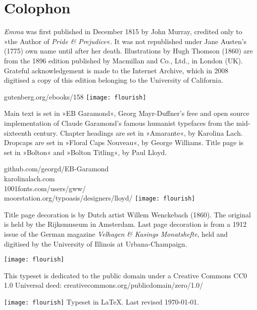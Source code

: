 \documentclass[
paper=5.5in:8.5in,
]{scrbook}
\begin{document}

\chapter*{Colophon}
\centering

\begin{minipage}{\textwidth}
\textit{Emma} was first published in December 1815 by John Murray, credited only to »the Author of \textit{Pride \& Prejudice}«. It was not republished under Jane Austen's (1775) own name until after her death. Illustrations by Hugh Thomson (1860) are from the 1896 edition published by Macmillan and Co., Ltd., in London (UK). Grateful acknowledgement is made to the Internet Archive, which in 2008 digitised a copy of this edition belonging to the University of California.
\end{minipage}
\vfill
gutenberg.org/ebooks/158
\vfill
\texttt{[image: flourish]}
\vfill
\begin{minipage}{\textwidth}
Main text is set in »EB Garamond«, Georg Mayr-Duffner's free and open source implementation of Claude Garamond’s famous humanist typefaces from the mid-sixteenth century. Chapter headings are set in »Amarante«, by Karolina Lach. Dropcaps are set in »Floral Caps Nouveau«, by George Williams. Title page is set in »Bolton« and »Bolton Titling«, by Paul Lloyd.
\end{minipage}
\vfill
github.com/georgd/EB-Garamond\\
karolinalach.com\\
1001fonts.com/users/gww/\\
moorstation.org/typoasis/designers/lloyd/
\vfill
\texttt{[image: flourish]}
\vfill
\begin{minipage}{\textwidth}
Title page decoration is by Dutch artist Willem Wenckebach (1860). The original is held by the Rijksmuseum in Amsterdam. Last page decoration is from a 1912 issue of the German magazine \textit{Velhagen \& Kasings Monatshefte}, held and digitised by the University of Illinois at Urbana-Champaign.
\end{minipage}
\vfill
\texttt{[image: flourish]}
\vfill
\begin{minipage}{\textwidth}
This typeset is dedicated to the public domain under a Creative Commons CC0 1.0 Universal deed: creativecommons.org/publicdomain/zero/1.0/
\end{minipage}
\vfill
\texttt{[image: flourish]}
\vfill
Typeset in \LaTeX{}. Last revised \today.
\thispagestyle{empty}
\end{document}
